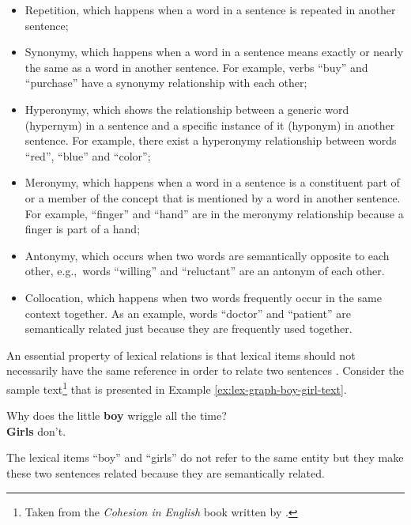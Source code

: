 \begin{itemize}

\item Repetition, which happens when a word in a sentence is repeated in another sentence; 


\item Synonymy, which happens when a word in a sentence means exactly or nearly the same as a word in another sentence. 
For example, verbs ``buy'' and ``purchase'' have a synonymy relationship with each other;  

\item Hyperonymy, which shows the relationship between a generic word (hypernym) in a sentence and a specific instance of it (hyponym) in another sentence. 
For example, there exist a hyperonymy relationship between words ``red'', ``blue'' and ``color'';

\item Meronymy, which happens when a word in a sentence is a constituent part of or a member of the concept that is mentioned by a word in another sentence. 
For example, ``finger'' and ``hand'' are in the meronymy relationship because a finger is part of a hand;

\item Antonymy, which occurs when two words are semantically opposite to each other, e.g.,\ words ``willing'' and  ``reluctant'' are an antonym of each other. 

\item Collocation, which happens when two words frequently occur in the same context together. As an example, words ``doctor'' and ``patient'' are semantically related just because they are frequently used together.

\end{itemize}

An essential property of lexical relations is that lexical items should not necessarily have the same reference in order to relate two sentences \cite{halliday76}.
Consider the sample text\footnote{Taken from the \emph{Cohesion in English} book written by .} that is presented in Example \ref{ex:lex-graph-boy-girl-text}.

\begin{examples}
  \label{ex:lex-graph-boy-girl-text}
  Why does the little \textbf{boy} wriggle all the time? \\
  \textbf{Girls} don't.
\end{examples}

The lexical items ``boy'' and ``girls'' do not refer to the same entity but they make these two sentences related because they are semantically related.  

